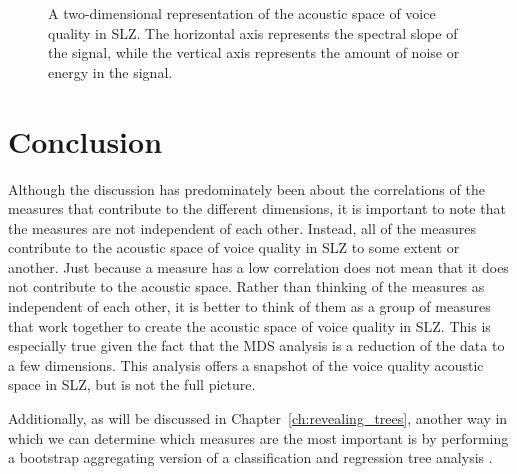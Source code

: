 \begin{figure}[h!]
    \centering
    \caption{A two-dimensional representation of the acoustic space of voice quality in SLZ. The horizontal axis represents the spectral slope of the signal, while the vertical axis represents the amount of noise or energy in the signal.}
    \label{fig:acoustic_space}
\end{figure}


\section{Conclusion} \label{sec:acousticlandscape:conclusion}

Although the discussion has predominately been about the correlations of the measures that contribute to the different dimensions, it is important to note that the measures are not independent of each other. Instead, all of the measures contribute to the acoustic space of voice quality in SLZ to some extent or another. Just because a measure has a low correlation does not mean that it does not contribute to the acoustic space. Rather than thinking of the measures as independent of each other, it is better to think of them as a group of measures that work together to create the acoustic space of voice quality in SLZ. This is especially true given the fact that the MDS analysis is a reduction of the data to a few dimensions. This analysis offers a snapshot of the voice quality acoustic space in SLZ, but is not the full picture. 

Additionally, as will be discussed in Chapter~\ref{ch:revealing_trees}, another way in which we can determine which measures are the most important is by performing a bootstrap aggregating version of a classification and regression tree analysis \citep{breimanClassificationRegressionTrees1986,breimanBaggingPredictors1996,breimanRandomForests2001}.